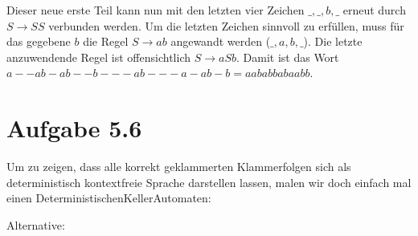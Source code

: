 \documentclass{article}
\begin{document}
Dieser neue erste Teil kann nun mit den letzten vier Zeichen $\_,\_,b,\_$ erneut durch $S \rightarrow SS$ verbunden werden. Um die letzten Zeichen sinnvoll zu erfüllen, muss für das gegebene $b$ die Regel $S \rightarrow ab$ angewandt werden ($\_,a,b,\_$). Die letzte anzuwendende Regel ist offensichtlich $S \rightarrow aSb$. Damit ist das Wort \linebreak $a--ab-ab--b---ab---a-ab-b = aababbabaabb$.



\section*{Aufgabe 5.6}
Um zu zeigen, dass alle korrekt geklammerten Klammerfolgen sich als deterministisch kontextfreie Sprache darstellen lassen, malen wir doch einfach mal einen DeterministischenKellerAutomaten:

\begin{center}
\end{center}
Alternative:
\begin{center}
\end{center}
\end{document}
